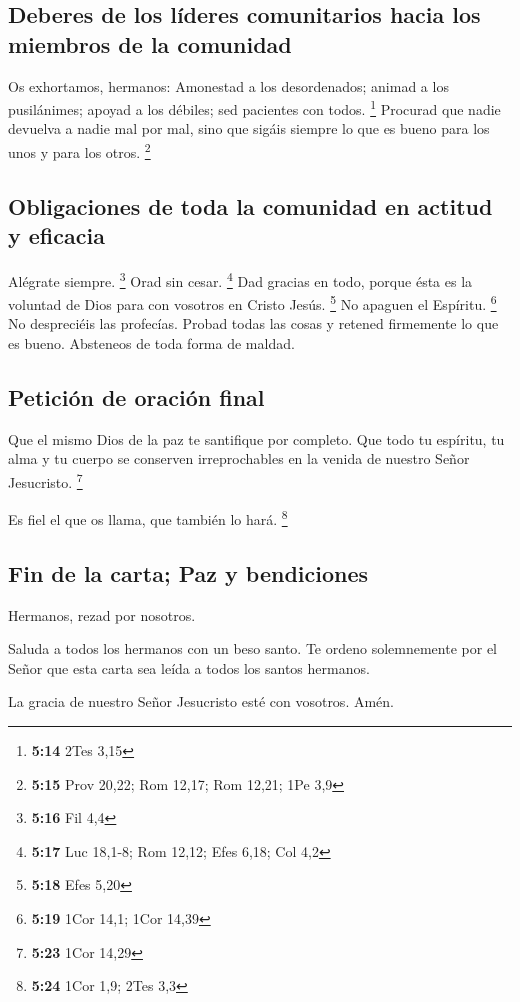 \hypertarget{deberes-de-los-luxedderes-comunitarios-hacia-los-miembros-de-la-comunidad}{%
\subsection{Deberes de los líderes comunitarios hacia los miembros de la
comunidad}\label{deberes-de-los-luxedderes-comunitarios-hacia-los-miembros-de-la-comunidad}}

 Os exhortamos, hermanos: Amonestad a los desordenados;
animad a los pusilánimes; apoyad a los débiles; sed pacientes con todos.
\footnote{\textbf{5:14} 2Tes 3,15}  Procurad que nadie
devuelva a nadie mal por mal, sino que sigáis siempre lo que es bueno
para los unos y para los otros. \footnote{\textbf{5:15} Prov 20,22; Rom
  12,17; Rom 12,21; 1Pe 3,9}

\hypertarget{obligaciones-de-toda-la-comunidad-en-actitud-y-eficacia}{%
\subsection{Obligaciones de toda la comunidad en actitud y
eficacia}\label{obligaciones-de-toda-la-comunidad-en-actitud-y-eficacia}}

 Alégrate siempre. \footnote{\textbf{5:16} Fil 4,4}
 Orad sin cesar. \footnote{\textbf{5:17} Luc 18,1-8; Rom
  12,12; Efes 6,18; Col 4,2}  Dad gracias en todo, porque
ésta es la voluntad de Dios para con vosotros en Cristo Jesús.
\footnote{\textbf{5:18} Efes 5,20}  No apaguen el
Espíritu. \footnote{\textbf{5:19} 1Cor 14,1; 1Cor 14,39} 
No despreciéis las profecías.  Probad todas las cosas y
retened firmemente lo que es bueno.  Absteneos de toda
forma de maldad.

\hypertarget{peticiuxf3n-de-oraciuxf3n-final}{%
\subsection{Petición de oración
final}\label{peticiuxf3n-de-oraciuxf3n-final}}

 Que el mismo Dios de la paz te santifique por completo.
Que todo tu espíritu, tu alma y tu cuerpo se conserven irreprochables en
la venida de nuestro Señor Jesucristo. \footnote{\textbf{5:23} 1Cor
  14,29}

 Es fiel el que os llama, que también lo hará.
\footnote{\textbf{5:24} 1Cor 1,9; 2Tes 3,3}

\hypertarget{fin-de-la-carta-paz-y-bendiciones}{%
\subsection{Fin de la carta; Paz y
bendiciones}\label{fin-de-la-carta-paz-y-bendiciones}}

 Hermanos, rezad por nosotros.

 Saluda a todos los hermanos con un beso santo.
 Te ordeno solemnemente por el Señor que esta carta sea
leída a todos los santos hermanos.

 La gracia de nuestro Señor Jesucristo esté con vosotros.
Amén.
